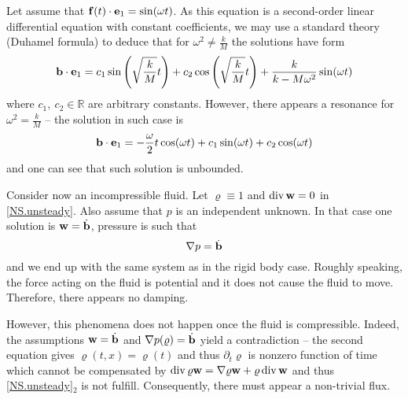 \documentclass{article}
\DeclareMathOperator{\diver}{div}
\newcommand{\bb}{{\bf b}}
\newcommand{\vb}{\bb}
\newcommand{\be}{{\bf e}}
\newcommand{\bw}{{\bf w}}
\newcommand{\vw}{\bw}
\newcommand{\pat}{\partial_t}
\numberwithin{equation}{section}
\begin{document}
Let assume that ${\bf f}(t)\cdot \be_1 = \sin (\omega t)$. As this equation is a second-order linear differential equation with constant coefficients, we may use a standard theory (Duhamel formula) to deduce that for $\omega^2\neq \frac kM$ the solutions have form
$$
\bb\cdot \be_1 = c_1 \sin\left(\sqrt{\frac kM} t\right) + c_2\cos \left(\sqrt{\frac kM} t\right) + \frac{k}{k-M\omega^2}\sin (\omega t)
$$
where $c_1,\ c_2\in \mathbb R$ are arbitrary constants. 
However, there appears a resonance for $\omega^2 = \frac kM$ -- the solution in such case is 
\begin{equation*}%
\bb\cdot \be_1 =-\frac\omega{2} t \cos (\omega t) +  c_1 \sin(\omega t) + c_2\cos (\omega t)
\end{equation*}
and one can see that such solution is unbounded.

Consider now an incompressible fluid. Let $\varrho \equiv 1$ and $\diver \bw = 0$ in \eqref{NS.unsteady}. Also assume that $p$ is an independent unknown. In that case one solution is $\bw = \dot \bb$, pressure is such that 
$$
\nabla p = \dot \bb
$$
and we end up with the same system as in the rigid body case. Roughly speaking, the force acting on the fluid is potential and it does not cause the fluid to move. Therefore, there appears no damping. 

However, this phenomena does not happen once the fluid is compressible. Indeed, the assumptions $\vw = \dot \vb$  and $\nabla p(\varrho) = \dot \vb$ yield a contradiction -- the second equation gives $\varrho(t,x) = \varrho(t)$ and thus $\pat \varrho$ is nonzero function of time which cannot be compensated by $\diver \varrho \vw = \nabla \varrho \vw + \varrho \diver \vw$ and thus \eqref{NS.unsteady}$_2$ is not fulfill. Consequently, there must appear a non-trivial flux.
\end{document}
